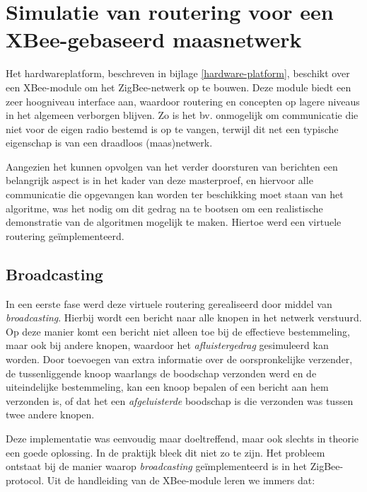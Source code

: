 
\chapter{Simulatie van routering voor een XBee-gebaseerd maasnetwerk}
\label{virtual-mesh}

Het hardwareplatform, beschreven in bijlage \ref{hardware-platform}, beschikt
over een XBee-module om het ZigBee-netwerk op te bouwen. Deze module biedt een
zeer hoogniveau interface aan, waardoor routering en concepten op lagere
niveaus in het algemeen verborgen blijven. Zo is het bv. onmogelijk om
communicatie die niet voor de eigen radio bestemd is op te vangen, terwijl dit
net een typische eigenschap is van een draadloos (maas)netwerk.

Aangezien het kunnen opvolgen van het verder doorsturen van berichten een
belangrijk aspect is in het kader van deze masterproef, en hiervoor alle
communicatie die opgevangen kan worden ter beschikking moet staan van het
algoritme, was het nodig om dit gedrag na te bootsen om een realistische
demonstratie van de algoritmen mogelijk te maken. Hiertoe werd een virtuele
routering ge\"implementeerd.

\section{Broadcasting}
\label{zigbee-broadcasting}

In een eerste fase werd deze virtuele routering gerealiseerd door middel van
\emph{broadcasting}. Hierbij wordt een bericht naar alle knopen in het netwerk
verstuurd. Op deze manier komt een bericht niet alleen toe bij de effectieve
bestemmeling, maar ook bij andere knopen, waardoor het \emph{afluistergedrag}
gesimuleerd kan worden. Door toevoegen van extra informatie over de
oorspronkelijke verzender, de tussenliggende knoop waarlangs de boodschap
verzonden werd en de uiteindelijke bestemmeling, kan een knoop bepalen of een
bericht aan hem verzonden is, of dat het een \emph{afgeluisterde} boodschap is
die verzonden was tussen twee andere knopen.

Deze implementatie was eenvoudig maar doeltreffend, maar ook slechts in theorie
een goede oplossing. In de praktijk bleek dit niet zo te zijn. Het probleem
ontstaat bij de manier waarop \emph{broadcasting} ge\"implementeerd is in het
ZigBee-protocol. Uit de handleiding van de XBee-module \citep{manual:xbee}
leren we immers dat:

